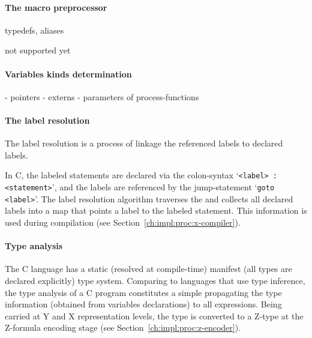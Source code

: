 \paragraph{The macro preprocessor}

typedefs, aliases

not supported yet

\paragraph{Variables kinds determination}
\label{ch:impl:proc:x-pre-compiler:var}

- pointers
- externs
- parameters of process-functions


\paragraph{The label resolution}
\label{ch:impl:proc:x-pre-compiler:label}


The label resolution is a process of linkage the referenced labels to declared labels.

In C, the labeled statements are declared via the colon-syntax `\texttt{<label> : <statement>}',
and the labels are referenced by the jump-statement `\texttt{goto <label>}'.
The label resolution algorithm traverses the \ytree{} and collects all declared labels into a map that points a label to the labeled statement. %
This information is used during compilation (see Section~\ref{ch:impl:proc:x-compiler}).


\paragraph{Type analysis}%
\label{ch:impl:proc:x-pre-compiler:type}

The C language has a static (resolved at compile-time) manifest (all types are declared explicitly) type system.
Comparing to languages that use type inference, the type analysis of a C program constitutes a simple propagating the type information (obtained from variables declarations) to all expressions.
Being carried at Y and X representation levels, the type is converted to a Z-type at the Z-formula encoding stage (see Section~\ref{ch:impl:proc:z-encoder}).

